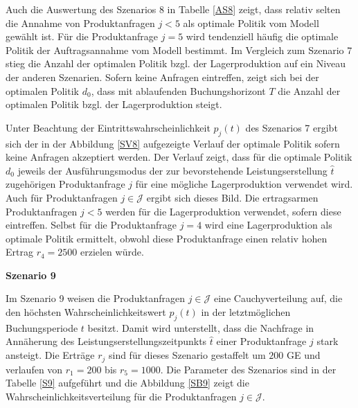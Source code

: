 Auch die Auswertung des Szenarios 8 in Tabelle \ref{AS8} zeigt, dass relativ selten die Annahme von Produktanfragen $j<5$ als optimale Politik vom Modell gewählt ist. Für die Produktanfrage $j=5$ wird tendenziell häufig die optimale Politik der Auftragsannahme vom Modell bestimmt. Im Vergleich zum Szenario 7 stieg die Anzahl der optimalen Politik bzgl. der Lagerproduktion auf ein Niveau der anderen Szenarien. Sofern keine Anfragen eintreffen, zeigt sich bei der optimalen Politik $d_0$, dass mit ablaufenden Buchungshorizont $T$ die Anzahl der optimalen Politik bzgl. der Lagerproduktion steigt.

Unter Beachtung der Eintrittswahrscheinlichkeit $p_j(t)$ des Szenarios 7 ergibt sich der in der Abbildung \ref{SV8} aufgezeigte Verlauf der optimale Politik sofern keine Anfragen akzeptiert werden. Der Verlauf zeigt, dass für die optimale Politik $d_0$ jeweils der Ausführungsmodus der zur bevorstehende Leistungserstellung $\hat t$ zugehörigen Produktanfrage $j$ für eine mögliche Lagerproduktion verwendet wird. Auch für Produktanfragen $j\in\mathcal{J}$ ergibt sich dieses Bild. Die ertragsarmen Produktanfragen $j<5$ werden für die Lagerproduktion verwendet, sofern diese eintreffen. Selbst für die Produktanfrage $j=4$ wird eine Lagerproduktion als optimale Politik ermittelt, obwohl diese Produktanfrage einen relativ hohen Ertrag $r_4=2500$ erzielen würde. 

\textbf{Szenario 9}

Im Szenario 9 weisen die Produktanfragen $j\in\mathcal{J}$ eine Cauchyverteilung auf, die den höchsten Wahrscheinlichkeitswert $p_j(t)$ in der letztmöglichen Buchungsperiode $t$ besitzt. Damit wird unterstellt, dass die Nachfrage in Annäherung des Leistungserstellungszeitpunkts $\hat t$ einer Produktanfrage $j$ stark ansteigt. Die Erträge $r_j$ sind für dieses Szenario gestaffelt um $200$ GE und verlaufen von $r_1=200$ bis $r_5=1000$. Die Parameter des Szenarios sind in der Tabelle \ref{S9} aufgeführt und die Abbildung \ref{SB9} zeigt die Wahrscheinlichkeitsverteilung für die Produktanfragen $j\in\mathcal{J}$. 

